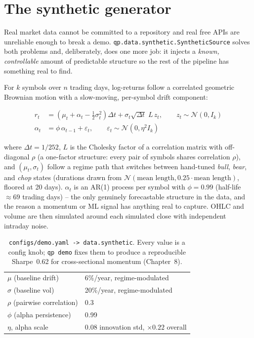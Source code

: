 \section{The synthetic generator}

Real market data cannot be committed to a repository and real free APIs are
unreliable enough to break a demo. \texttt{qp.data.synthetic.SyntheticSource}
solves both problems and, deliberately, does one more job: it injects a
\emph{known, controllable} amount of predictable structure so the rest of the
pipeline has something real to find.

For $k$ symbols over $n$ trading days, log-returns follow a correlated
geometric Brownian motion with a slow-moving, per-symbol drift component:

\begin{align}
  r_t &= \left(\mu_t + \alpha_t - \tfrac{1}{2}\sigma_t^2\right)\Delta t
         + \sigma_t \sqrt{\Delta t}\; L\, z_t, \qquad z_t \sim \mathcal N(0, I_k) \\
  \alpha_t &= \phi\, \alpha_{t-1} + \varepsilon_t, \qquad \varepsilon_t \sim \mathcal N(0, \eta^2 I_k)
\end{align}

where $\Delta t = 1/252$, $L$ is the Cholesky factor of a correlation matrix
with off-diagonal $\rho$ (a one-factor structure: every pair of symbols shares
correlation $\rho$), and $(\mu_t, \sigma_t)$ follow a regime path that switches
between hand-tuned \emph{bull}, \emph{bear}, and \emph{chop} states (durations
drawn from $\mathcal N(\text{mean length}, 0.25\cdot\text{mean length})$, floored
at 20 days). $\alpha_t$ is an AR(1) process per symbol with $\phi = 0.99$
(half-life $\approx 69$ trading days) -- the only genuinely forecastable
structure in the data, and the reason a momentum or ML signal has anything real
to capture. OHLC and volume are then simulated around each simulated close with
independent intraday noise.

\begin{table}[h]
\footnotesize
\centering
\begin{tabularx}{\textwidth}{L{3cm} X}
\toprule
{} &  \\
\midrule
$\mu$ (baseline drift) & 6\%/year, regime-modulated \\
$\sigma$ (baseline vol) & 20\%/year, regime-modulated \\
$\rho$ (pairwise correlation) & 0.3 \\
$\phi$ (alpha persistence) & 0.99 \\
$\eta$, alpha scale & 0.08 innovation std, $\times 0.22$ overall \\
\bottomrule
\end{tabularx}
\caption{\texttt{configs/demo.yaml -> data.synthetic}. Every value is a config
knob; \texttt{qp demo} fixes them to produce a reproducible Sharpe~0.62 for
cross-sectional momentum (Chapter~8).}
\end{table}

